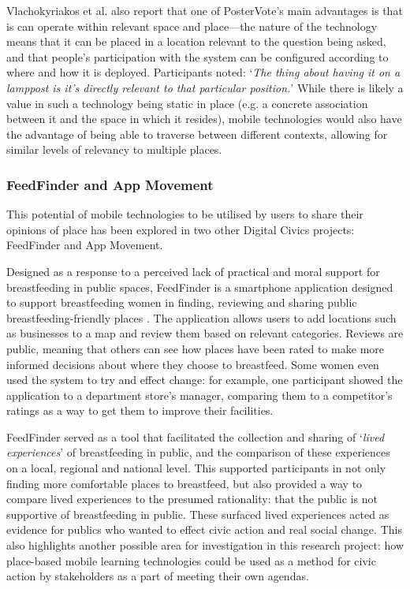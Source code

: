 Vlachokyriakos et al. also report that one of PosterVote's main advantages is that is can operate within relevant space and place---the nature of the technology means that it can be placed in a location relevant to the question being asked, and that people's participation with the system can be configured according to where and how it is deployed. Participants noted: `\textit{The thing about having it on a lamppost is it's directly relevant to that particular position.}' While there is likely a value in such a technology being static in place (e.g. a concrete association between it and the space in which it resides), mobile technologies would also have the advantage of being able to traverse between different contexts, allowing for similar levels of relevancy to multiple places. 

\subsubsection{FeedFinder and App Movement}

This potential of mobile technologies to be utilised by users to share their opinions of place has been explored in two other Digital Civics projects: FeedFinder and App Movement. 

Designed as a response to a perceived lack of practical and moral support for breastfeeding in public spaces, FeedFinder is a smartphone application designed to support breastfeeding women in finding, reviewing and sharing public breastfeeding-friendly places \citep{Balaam2015}. The application allows users to add locations such as businesses to a map and review them based on relevant categories. Reviews are public, meaning that others can see how places have been rated to make more informed decisions about where they choose to breastfeed. Some women even used the system to try and effect change: for example, one participant showed the application to a department store's manager, comparing them to a competitor's ratings as a way to get them to improve their facilities. 

FeedFinder served as a tool that facilitated the collection and sharing of `\textit{lived experiences}' of breastfeeding in public, and the comparison of these experiences on a local, regional and national level. This supported participants in not only finding more comfortable places to breastfeed, but also provided a way to compare lived experiences to the presumed rationality: that the public is not supportive of breastfeeding in public. These surfaced lived experiences acted as evidence for publics who wanted to effect civic action and real social change. This also highlights another possible area for investigation in this research project: how place-based mobile learning technologies could be used as a method for civic action by stakeholders as a part of meeting their own agendas.

